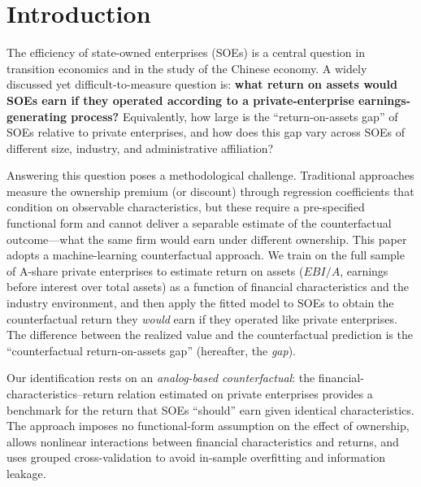 \documentclass[11pt,a4paper]{article}
\begin{document}
\section{Introduction}

The efficiency of state-owned enterprises (SOEs) is a central question in transition economics and in the study of the Chinese economy. A widely discussed yet difficult-to-measure question is: \textbf{what return on assets would SOEs earn if they operated according to a private-enterprise earnings-generating process?} Equivalently, how large is the ``return-on-assets gap'' of SOEs relative to private enterprises, and how does this gap vary across SOEs of different size, industry, and administrative affiliation?

Answering this question poses a methodological challenge. Traditional approaches measure the ownership premium (or discount) through regression coefficients that condition on observable characteristics, but these require a pre-specified functional form and cannot deliver a separable estimate of the counterfactual outcome---what the same firm would earn under different ownership. This paper adopts a machine-learning counterfactual approach. We train on the full sample of A-share private enterprises to estimate return on assets ($EBI/A$, earnings before interest over total assets) as a function of financial characteristics and the industry environment, and then apply the fitted model to SOEs to obtain the counterfactual return they \emph{would} earn if they operated like private enterprises. The difference between the realized value and the counterfactual prediction is the ``counterfactual return-on-assets gap'' (hereafter, the \emph{gap}).

Our identification rests on an \emph{analog-based counterfactual}: the financial-characteristics--return relation estimated on private enterprises provides a benchmark for the return that SOEs ``should'' earn given identical characteristics. The approach imposes no functional-form assumption on the effect of ownership, allows nonlinear interactions between financial characteristics and returns, and uses grouped cross-validation to avoid in-sample overfitting and information leakage.
\end{document}
